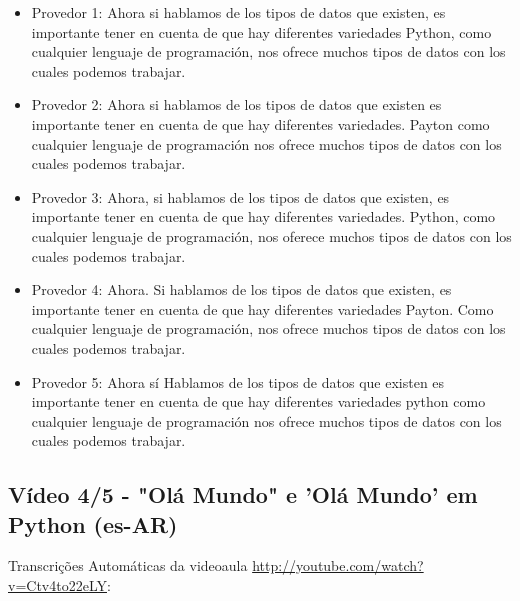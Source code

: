 \begin{itemize}
    \item Provedor 1: Ahora si hablamos de los tipos de datos que existen, es importante tener en cuenta de que hay diferentes variedades Python, como cualquier lenguaje de programación, nos ofrece muchos tipos de datos con los cuales podemos trabajar.
    \item Provedor 2: Ahora si hablamos de los tipos de datos que existen es importante tener en cuenta de que hay diferentes variedades. Payton como cualquier lenguaje de programación nos ofrece muchos tipos de datos con los cuales podemos trabajar.
    \item Provedor 3: Ahora, si hablamos de los tipos de datos que existen, es importante tener en cuenta de que hay diferentes variedades. Python, como cualquier lenguaje de programación, nos oferece muchos tipos de datos con los cuales podemos trabajar.
    \item Provedor 4: Ahora. Si hablamos de los tipos de datos que existen, es importante tener en cuenta de que hay diferentes variedades Payton. Como cualquier lenguaje de programación, nos ofrece muchos tipos de datos con los cuales podemos trabajar.
    \item Provedor 5: Ahora sí Hablamos de los tipos de datos que existen es importante tener en cuenta de que hay diferentes variedades python como cualquier lenguaje de programación nos ofrece muchos tipos de datos con los cuales podemos trabajar.
\end{itemize}

\subsection{Vídeo 4/5 - "Olá Mundo" e 'Olá Mundo' em Python (es-AR)}

\noindent
Transcrições Automáticas da videoaula \url{http://youtube.com/watch?v=Ctv4to22eLY}:

